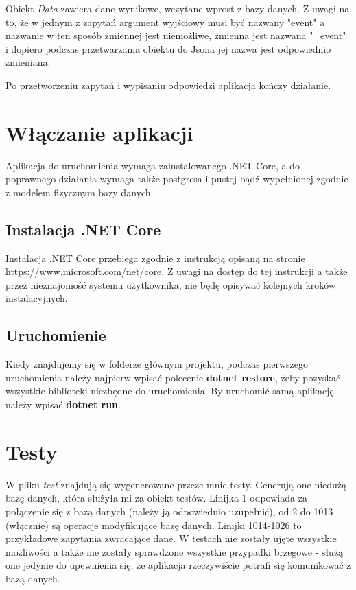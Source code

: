 \documentclass[a4paper]{article}
\begin{document}
Obiekt \textit{Data} zawiera dane wynikowe, wczytane wprost z bazy danych. Z uwagi na to, że w jednym z zapytań argument wyjściowy musi być nazwany "event" a nazwanie w ten sposób zmiennej jest niemożliwe, zmienna jest nazwana "\_event" i dopiero podczas przetwarzania obiektu do Jsona jej nazwa jest odpowiednio zmieniana.

Po przetworzeniu zapytań i wypisaniu odpowiedzi aplikacja kończy działanie.

\section{Włączanie aplikacji}
Aplikacja do uruchomienia wymaga zainstalowanego .NET Core, a do poprawnego działania wymaga także postgresa i pustej bądź wypełnionej zgodnie z modelem fizycznym bazy danych.

\subsection{Instalacja .NET Core}
Instalacja .NET Core przebiega zgodnie z instrukcją opisaną na stronie \url{https://www.microsoft.com/net/core}. Z uwagi na dostęp do tej instrukcji a także przez nieznajomość systemu użytkownika, nie będę opisywać kolejnych kroków instalacyjnych.

\subsection{Uruchomienie}
Kiedy znajdujemy się w folderze głównym projektu, podczas pierwszego uruchomienia należy najpierw wpisać polecenie \textbf{dotnet restore}, żeby pozyskać wszystkie biblioteki niezbędne do uruchomienia. By uruchomić samą aplikację należy wpisać \textbf{dotnet run}.

\section{Testy}
W pliku \textit{test} znajdują się wygenerowane przeze mnie testy. Generują one niedużą bazę danych, która służyła mi za obiekt testów. Linijka 1 odpowiada za połączenie się z bazą danych (należy ją odpowiednio uzupełnić), od 2 do 1013 (włącznie) są operacje modyfikujące bazę danych. Linijki 1014-1026 to przykładowe zapytania zwracające dane. W testach nie zostały ujęte wszystkie możliwości a także nie zostały sprawdzone wszystkie przypadki brzegowe - służą one jedynie do upewnienia się, że aplikacja rzeczywiście potrafi się komunikować z bazą danych. 
\end{document}
